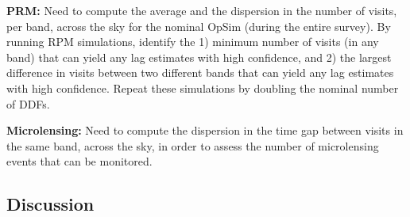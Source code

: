 {\bf PRM:} Need to compute the average and the dispersion in the number of visits, per band, across the sky
for the nominal OpSim (during the entire survey). By running RPM simulations, identify the 1) minimum number of visits (in any band) that can yield any lag estimates with high confidence, and 2) the largest difference in visits between two
different bands that can yield any lag estimates with high confidence. Repeat these simulations by doubling the nominal number of DDFs.

{\bf Microlensing:} Need to compute the dispersion in the time gap between visits in the same band, across the sky,
in order to assess the number of microlensing events that can be monitored.


\subsection{Discussion}
\label{sec:\secname:discussion}


\navigationbar
